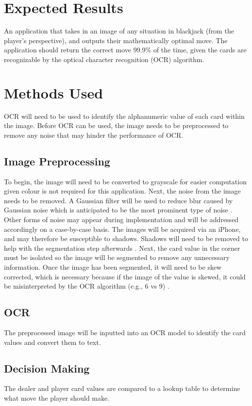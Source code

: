 \documentclass[conference]{IEEEtran}
\begin{document}
\section{Expected Results}

An application that takes in an image of any situation in blackjack (from the player’s
perspective), and outputs their mathematically optimal move. The application should return
the correct move 99.9\% of the time, given the cards are recognizable by the optical character
recognition (OCR) algorithm. 

\section{Methods Used}
OCR will need to be used to identify the alphanumeric value of each card within the image.
Before OCR can be used, the image needs to be preprocessed to remove any noise that may hinder
the performance of OCR.

\subsection{Image Preprocessing}
To begin, the image will need to be converted to grayscale for easier computation given colour
is not required for this application. Next, the noise from the image needs to be removed. A
Gaussian filter will be used to reduce blur caused by Gaussian noise which is anticipated to be
the most prominent type of noise \cite{boncelet_image_2009}. Other forms of noise may appear during implementation and
will be addressed accordingly on a case-by-case basis. The images will be acquired via an iPhone,
and may therefore be susceptible to shadows. Shadows will need to be removed to help with the
segmentation step afterwards \cite{finlayson_removing_2002}. Next, the card value in the corner must be isolated so the image
will be segmented to remove any unnecessary information. Once the image has been segmented, it
will need to be skew corrected, which is necessary because if the image of the value is skewed,
it could be misinterpreted by the OCR algorithm (e.g., 6 vs 9)  \cite{sarfraz_novel_2005}.

\subsection{OCR}
The preprocessed image will be inputted into an OCR model to identify the card values and
convert them to text.

\subsection{Decision Making}
The dealer and player card values are compared to a lookup table to determine what move the player
should make.



\end{document}
